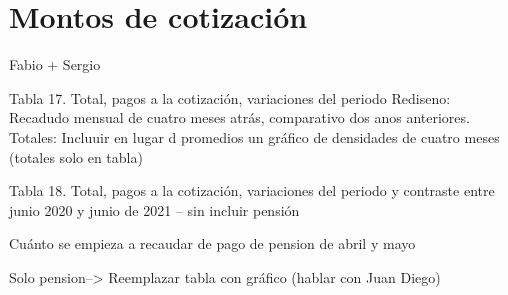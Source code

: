 \section{Montos de cotización}

Fabio + Sergio 


Tabla 17. Total, pagos a la cotización, variaciones del periodo
Rediseno: Recadudo mensual de cuatro meses atrás, comparativo dos anos anteriores. 
Totales: 
Incluuir en lugar d promedios un gráfico de densidades de cuatro meses (totales solo en tabla)  


Tabla 18. Total, pagos a la cotización, variaciones del periodo y contraste entre
junio 2020 y junio de 2021 – sin incluir pensión

Cuánto se empieza a recaudar de pago de pension de abril y mayo 

Solo pension--> Reemplazar tabla con gráfico (hablar con Juan Diego) 


